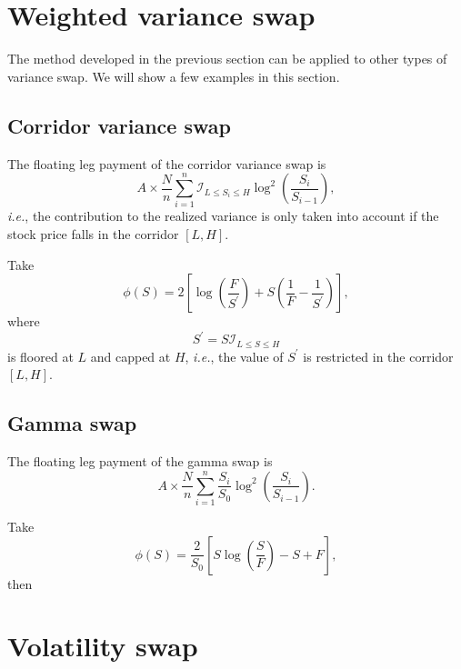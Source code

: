 \documentclass[12pt]{article}
\begin{document}
\section{Weighted variance swap}

  The method developed in the previous section can be applied to other types of variance swap. We will show a few examples in
  this section.

  \subsection{Corridor variance swap}

    The floating leg payment of the corridor variance swap is
    \begin{equation}
      A\times\frac{N}{n}\sum_{i=1}^{n}\mathcal{I}_{L\leq S_i \leq H}\log^2\left(\frac{S_i}{S_{i-1}}\right),
    \end{equation}
    {\it i.e.}, the contribution to the realized variance is only taken into account if the stock price falls
    in the corridor $[L,H]$.

    Take
    \begin{equation}
      \phi(S) = 2\left[\log\left(\frac{F}{S^{\prime}}\right)+S\left(\frac{1}{F}-\frac{1}{S^{\prime}}\right)\right],
    \end{equation}
    where
    \begin{equation}
      S^{\prime} = S\mathcal{I}_{L\leq S \leq H}
    \end{equation}
    is floored at $L$ and capped at $H$, {\it i.e.}, the value of $S^{\prime}$ is restricted in the corridor $[L,H]$.

  \subsection{Gamma swap}

    The floating leg payment of the gamma swap is
    \begin{equation}
      A\times\frac{N}{n}\sum_{i=1}^{n}\frac{S_i}{S_0}\log^2\left(\frac{S_i}{S_{i-1}}\right).
    \end{equation}

    Take
    \begin{equation}
      \phi(S) = \frac{2}{S_0}\left[S\log\left(\frac{S}{F}\right)-S+F\right],
    \end{equation}
    then


\section{Volatility swap}
\end{document}
